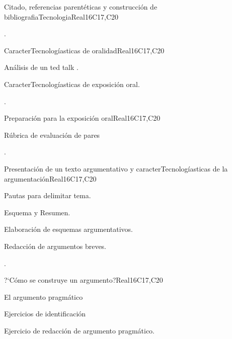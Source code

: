\begin{syllabus}
\begin{unit}{Citado, referencias parentéticas y construcción de bibliografiaTecnologia}{}{Real}{16}{C17,C20}
  \begin{learningoutcomes}
   \item .%
  \end{learningoutcomes}
\end{unit}

\begin{unit}{CaracterTecnologíasticas de oralidad}{}{Real}{16}{C17,C20}
  \begin{topics}
      \item Análisis de un ted talk .
      \item CaracterTecnologíasticas de exposición oral.
  \end{topics}

  \begin{learningoutcomes}
   \item .%
  \end{learningoutcomes}
\end{unit}

\begin{unit}{Preparación para la exposición oral}{}{Real}{16}{C17,C20}
  \begin{topics}
      \item Rúbrica de evaluación de pares
  \end{topics}

  \begin{learningoutcomes}
   \item .%
  \end{learningoutcomes}
\end{unit}

\begin{unit}{Presentación de un texto argumentativo y caracterTecnologíasticas de la argumentación}{}{Real}{16}{C17,C20}
  \begin{topics}
      \item Pautas para delimitar tema.
      \item Esquema y Resumen.
      \item Elaboración de esquemas argumentativos.
      \item Redacción de argumentos breves.
  \end{topics}

  \begin{learningoutcomes}
   \item .%
  \end{learningoutcomes}
\end{unit}

\begin{unit}{?`Cómo se construye un argumento?}{}{Real}{16}{C17,C20}
  \begin{topics}
      \item El argumento pragmático
      \item Ejercicios de identificación 
      \item Ejercicio de redacción de argumento pragmático.
  \end{topics}


\end{unit}
\end{syllabus}
